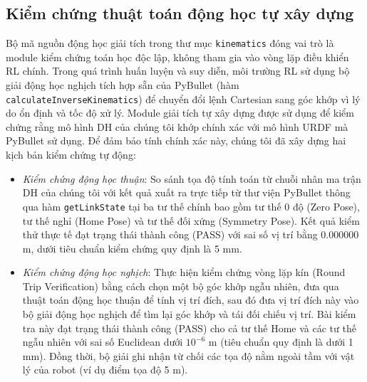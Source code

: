 \documentclass[conference]{IEEEtran}
\begin{document}
\subsection{Kiểm chứng thuật toán động học tự xây dựng}
Bộ mã nguồn động học giải tích trong thư mục \texttt{kinematics} đóng vai trò là module kiểm chứng toán học độc lập, không tham gia vào vòng lặp điều khiển RL chính. Trong quá trình huấn luyện và suy diễn, môi trường RL sử dụng bộ giải động học nghịch tích hợp sẵn của PyBullet (hàm \texttt{calculateInverseKinematics}) để chuyển đổi lệnh Cartesian sang góc khớp vì lý do ổn định và tốc độ xử lý. Module giải tích tự xây dựng được sử dụng để kiểm chứng rằng mô hình DH của chúng tôi khớp chính xác với mô hình URDF mà PyBullet sử dụng. Để đảm bảo tính chính xác này, chúng tôi đã xây dựng hai kịch bản kiểm chứng tự động:
\begin{itemize}
    \item \textit{Kiểm chứng động học thuận}: So sánh tọa độ tính toán từ chuỗi nhân ma trận DH của chúng tôi với kết quả xuất ra trực tiếp từ thư viện PyBullet thông qua hàm \texttt{getLinkState} tại ba tư thế chính bao gồm tư thế 0 độ (Zero Pose), tư thế nghỉ (Home Pose) và tư thế đối xứng (Symmetry Pose). Kết quả kiểm thử thực tế đạt trạng thái thành công (PASS) với sai số vị trí bằng 0.000000 m, dưới tiêu chuẩn kiểm chứng quy định là 5 mm.
    \item \textit{Kiểm chứng động học nghịch}: Thực hiện kiểm chứng vòng lặp kín (Round Trip Verification) bằng cách chọn một bộ góc khớp ngẫu nhiên, đưa qua thuật toán động học thuận để tính vị trí đích, sau đó đưa vị trí đích này vào bộ giải động học nghịch để tìm lại góc khớp và tái đối chiếu vị trí. Bài kiểm tra này đạt trạng thái thành công (PASS) cho cả tư thế Home và các tư thế ngẫu nhiên với sai số Euclidean dưới $10^{-6}$ m (tiêu chuẩn quy định là dưới 1 mm). Đồng thời, bộ giải ghi nhận từ chối các tọa độ nằm ngoài tầm với vật lý của robot (ví dụ điểm tọa độ 5 m).
\end{itemize}
\end{document}
